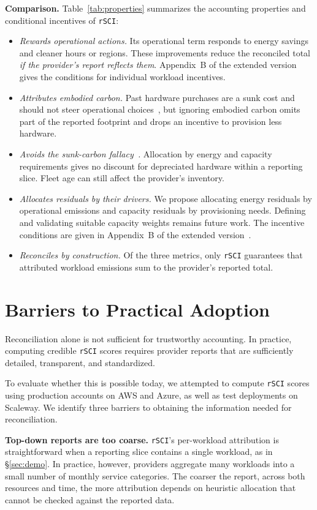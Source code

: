 \documentclass[sigconf]{acmart}
\newcommand{\parag}[1]{\vspace{2mm}\noindent\textbf{#1.}\hspace{2mm}}
\newcommand{\RSCI}{\texttt{rSCI}\xspace}
\begin{document}
\parag{Comparison}
Table~\ref{tab:properties} summarizes the accounting properties and conditional incentives of \RSCI:
\begin{itemize}
  \item \emph{Rewards operational actions.} Its operational term responds to energy savings and cleaner hours or regions.
  These improvements reduce the reconciled total \emph{if the provider's report reflects them}.
  Appendix~B of the extended version~\cite{rsci-extended} gives the conditions for individual workload incentives.
  \item \emph{Attributes embodied carbon.} Past hardware purchases are a sunk cost and should not steer operational choices~\cite{bashir2024}, but ignoring embodied carbon omits part of the reported footprint and drops an incentive to provision less hardware.
  \item \emph{Avoids the sunk-carbon fallacy~\cite{bashir2024}.} Allocation by energy and capacity requirements gives no discount for depreciated hardware within a reporting slice.
  Fleet age can still affect the provider's inventory.
  \item \emph{Allocates residuals by their drivers.} We propose allocating energy residuals by operational emissions and capacity residuals by provisioning needs.
  Defining and validating suitable capacity weights remains future work.
  The incentive conditions are given in Appendix~B of the extended version~\cite{rsci-extended}.
  \item \emph{Reconciles by construction.} Of the three metrics, only \RSCI guarantees that attributed workload emissions sum to the provider's reported total.
\end{itemize}

\section{Barriers to Practical Adoption}
\label{sec:practice}

Reconciliation alone is not sufficient for trustworthy accounting.
In practice, computing credible \RSCI scores requires provider reports that are sufficiently detailed, transparent, and standardized.

To evaluate whether this is possible today, we attempted to compute \RSCI scores using production accounts on AWS and Azure, as well as test deployments on Scaleway.
We identify three barriers to obtaining the information needed for reconciliation.

\parag{Top-down reports are too coarse}
\RSCI's per-workload attribution is straightforward when a reporting slice contains a single workload, as in \S\ref{sec:demo}.
In practice, however, providers aggregate many workloads into a small number of monthly service categories.
The coarser the report, across both resources and time, the more attribution depends on heuristic allocation that cannot be checked against the reported data.
\end{document}
